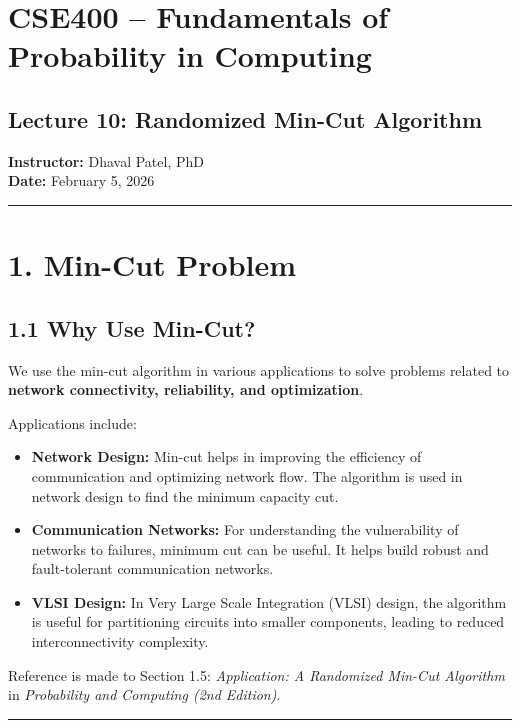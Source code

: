 \documentclass[12pt]{article}
\begin{document}
\section*{CSE400 – Fundamentals of Probability in Computing}

\subsection*{Lecture 10: Randomized Min-Cut Algorithm}
\textbf{Instructor:} Dhaval Patel, PhD \\
\textbf{Date:} February 5, 2026

\hrule
\vspace{0.5cm}

\section*{1. Min-Cut Problem}

\subsection*{1.1 Why Use Min-Cut?}

We use the min-cut algorithm in various applications to solve problems related to \textbf{network connectivity, reliability, and optimization}.

Applications include:

\begin{itemize}
    \item \textbf{Network Design:}  
    Min-cut helps in improving the efficiency of communication and optimizing network flow. The algorithm is used in network design to find the minimum capacity cut.

    \item \textbf{Communication Networks:}  
    For understanding the vulnerability of networks to failures, minimum cut can be useful. It helps build robust and fault-tolerant communication networks.

    \item \textbf{VLSI Design:}  
    In Very Large Scale Integration (VLSI) design, the algorithm is useful for partitioning circuits into smaller components, leading to reduced interconnectivity complexity.
\end{itemize}

Reference is made to Section 1.5: \textit{Application: A Randomized Min-Cut Algorithm} in \textit{Probability and Computing (2nd Edition)}.

\hrule
\vspace{0.5cm}
\end{document}
